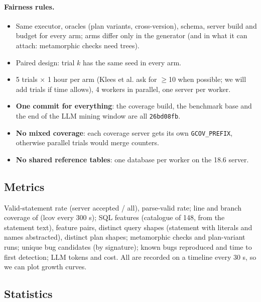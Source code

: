 \paragraph{Fairness rules.}
\begin{itemize}
  \item Same executor, oracles (plan variants, cross-version), schema, server
    build and budget for every arm; arms differ only in the generator (and in
    what it can attach: metamorphic checks need trees).
  \item Paired design: trial $k$ has the same seed in every arm.
  \item 5 trials $\times$ 1 hour per arm (Klees et al. ask for $\geq$10 when
    possible; we will add trials if time allows), 4 workers in parallel, one
    server per worker.
  \item \textbf{One commit for everything}: the coverage build, the benchmark
    base and the end of the LLM mining window are all \texttt{26bd08fb}.
  \item \textbf{No mixed coverage}: each coverage server gets its own
    \texttt{GCOV\_PREFIX}, otherwise parallel trials would merge counters.
  \item \textbf{No shared reference tables}: one database per worker on the
    18.6 server.
\end{itemize}

\subsection{Metrics}

Valid-statement rate (server accepted / all), parse-valid rate; line and
branch coverage of  (lcov every 300 s); SQL features
(catalogue of 148, from the statement text), feature pairs, distinct query
shapes (statement with literals and names abstracted), distinct plan shapes;
metamorphic checks and plan-variant runs; unique bug candidates (by
signature); known bugs reproduced and time to first detection; LLM tokens and
cost. All are recorded on a timeline every 30 s, so we can plot growth curves.

\subsection{Statistics}
\label{sec:stats}

